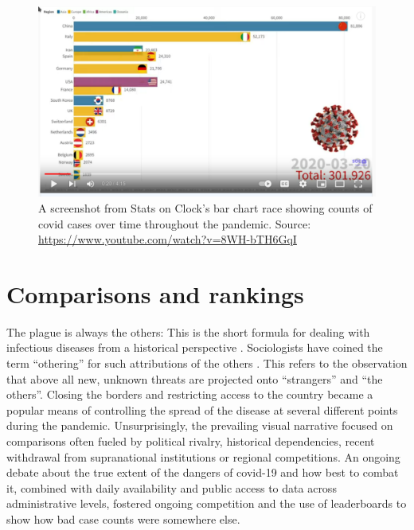 \documentclass[article]{jdssv}\usepackage[]{graphicx}\usepackage[]{color}
\begin{document}
\begin{figure}
\centering
\includegraphics[width=.8\linewidth]{Figures_Web/Bar-chart-race-screenshot}
\caption{A screenshot from Stats on Clock's bar chart race showing counts of covid cases over time throughout the pandemic. Source: \url{https://www.youtube.com/watch?v=8WH-bTH6GqI}}\label{fig:barchart-race}
\end{figure}




\section{Comparisons and rankings}
\label{sec:rankings}

The plague is always the others: This is the short formula for dealing with infectious diseases from a historical perspective \citep{thiessen2021}. Sociologists have coined the term ``othering'' for such attributions of the others \citep{mountz2009}. This refers to the observation that above all new, unknown threats are projected onto ``strangers'' and ``the others''. Closing the borders and restricting access to the country became a popular means of controlling the spread of the disease at several different points during the pandemic. Unsurprisingly, the prevailing visual narrative focused on comparisons often fueled by political rivalry, historical dependencies, recent withdrawal from supranational institutions or regional competitions. An ongoing debate about the true extent of the dangers of covid-19 and how best to combat it, combined with daily availability and public access to data across administrative levels, fostered ongoing competition and the use of leaderboards to show how bad case counts were somewhere else. 
\end{document}
